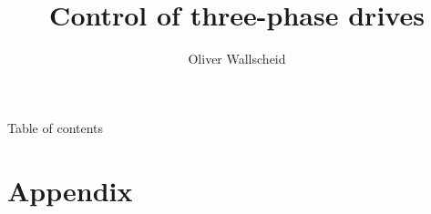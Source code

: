 \documentclass{../course_template/lectureClass}
\title[Control of three-phase drives]{Control of three-phase drives}
\author{Oliver Wallscheid}
\date{}
\begin{document}

\begin{frame}[plain]
    \titlepage
\end{frame}

\begin{frame}{Table of contents}
    \tableofcontents[hideallsubsections]
\end{frame}






\section{Appendix} %
\end{document}
